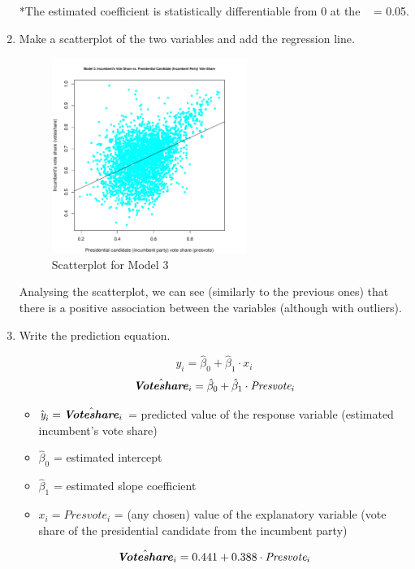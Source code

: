 \documentclass[12pt,letterpaper]{article}
\begin{document}
\begin{enumerate}
 *The estimated coefficient is statistically differentiable from 0 at the \alpha \  = 0.05.
		
		\item Make a scatterplot of the two variables and add the regression line. 

	 

				\begin{figure}[H]
				\centering
				\includegraphics[width=0.6\textwidth]{03.PS03_Skrypnyk_Plot3.pdf}
				\caption{Scatterplot for Model 3}
				\label{fig:Plot3}
			\end{figure}
			
Analysing the scatterplot, we can see (similarly to the previous ones) that there is a positive association between the variables (although with outliers). 
			
		\item Write the prediction equation.
	

	\begin{center}
	
	\[
	\hat{y_i} = \hat{\beta}_0 + \hat{\beta}_1 \cdot x_i
	\]
	\[\hat{\textbf{\textit{Voteshare}}}_i  = \hat{\beta}_0 + \hat{\beta}_1 \cdot  \textit{Presvote}_i
	\]
\end{center}

\begin{flushleft}
	
\begin{itemize}
	\item $\hat{\textit{y}}_i = \hat{\textbf{\textit{Voteshare}}}_i$ = predicted value of the response variable (estimated incumbent's vote share)
	\item $\hat{\beta}_0$ = estimated intercept
	\item $\hat{\beta}_1$ = estimated slope coefficient
	\item $x_i = \textit{Presvote}_i$ = (any chosen) value of the explanatory variable (vote share of the presidential candidate from the incumbent party)
\end{itemize}

\end{flushleft}
\[\hat{\textbf{\textit{Voteshare}}}_i  =  0.441 + 0.388\cdot  \textit{Presvote}_i
\]

	\end{enumerate}
\end{document}
